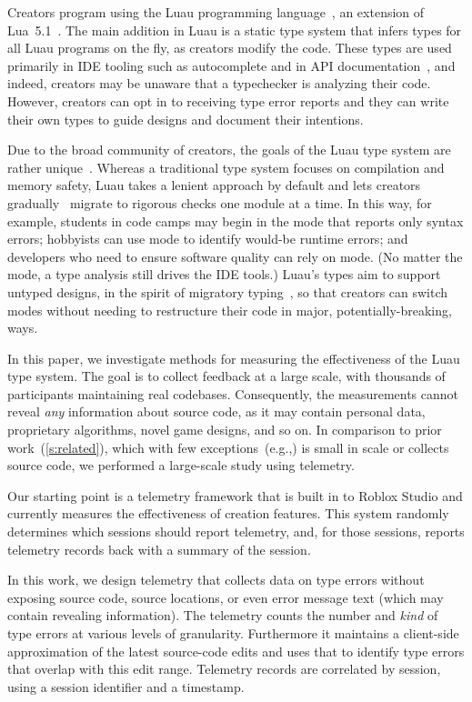 \documentclass[english,submission,cleveref]{programming}
\begin{document}
Creators program using the
{Luau} programming language~\cite{luau-lang.org},
an extension of {Lua~5.1~\cite{lua}}.
The main addition in Luau is a static type system that infers
types for all Luau programs on the fly, as creators modify the code.
These types are used primarily in IDE tooling such as autocomplete and
in API documentation~\cite{luau-autocomplete}, and indeed, creators
may be unaware that a typechecker is analyzing their code.
However, creators can opt in to receiving type error reports and they can write
their own types to guide designs and document their intentions.

Due to the broad community of creators, the goals of the Luau type
system are rather unique~\cite{bfj-hatra-2021}.
Whereas a traditional type system focuses on compilation and memory
safety, Luau takes a lenient approach by default and lets creators
gradually~\cite{st-sfp-2006,tf-popl-2008} migrate to rigorous checks
one module at a time.
In this way, for example,
students in code camps may begin in the \mnocheck{} mode that reports only
syntax errors; hobbyists can use \mnonstrict{} mode to identify
would-be runtime errors; and developers who need to ensure software
quality can rely on \mstrict{} mode.
(No matter the mode, a {\FS{}} type analysis still drives the IDE tools.)
Luau's types aim to support untyped designs, in the spirit of migratory
typing~\cite{tfffgksst-snapl-2017}, so that creators can switch modes without
needing to restructure their code in major, potentially-breaking, ways.

In this paper, we investigate methods for measuring the effectiveness
of the {Luau} type system.
The goal is to collect feedback at a large scale, with thousands
of participants maintaining real codebases.
Consequently, the measurements cannot reveal \emph{any} information about
source code, as it may contain personal data, proprietary algorithms, novel
game designs, and so on.
In comparison to prior work~(\cref{s:related}), which
with few exceptions~(e.g.,\cite{hlzbr-ecoop-2021}) is small in scale
or collects source code, we performed a large-scale study using \panon{}
{telemetry}.

Our starting point is a telemetry framework that is built in
to {Roblox Studio} and currently measures the effectiveness of
creation features.
This system randomly determines which sessions should report telemetry, and,
for those sessions, reports telemetry records back with a summary of the
session.

In this work, we design telemetry that collects data on type errors without
exposing source code, source locations, or even error message text (which
may contain revealing information).
The telemetry counts the number and \emph{kind} of type errors at various
levels of granularity.
Furthermore it maintains a client-side approximation of the latest source-code
edits and uses that to identify type errors that overlap with this edit range.
Telemetry records are correlated by session, using a \panon{} session
identifier and a timestamp.
\end{document}
